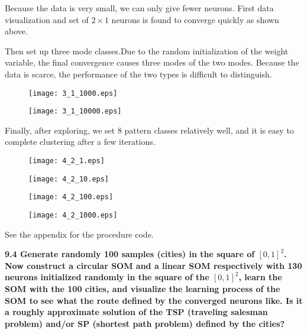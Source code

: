 Because the data is very small, we can only give fewer neurons.
First data visualization
and set of $2\times1$ neurons is found to converge quickly as shown above.

\newpage
Then set up three mode classes.Due to the random initialization of the weight variable, the final convergence causes three modes of the two modes. Because the data is scarce, the performance of the two types is difficult to distinguish.
\begin{figure}[!h]
\begin{minipage}
{0.5\linewidth}
\centering
\texttt{[image: 3\_1\_1000.eps]}
\end{minipage}
%
\begin{minipage}
{0.5\linewidth}
\centering
\texttt{[image: 3\_1\_10000.eps]}
\end{minipage}
\end{figure}


Finally, after exploring, we set 8 pattern classes relatively well, and it is easy to complete clustering after a few iterations.
\begin{figure}[!h]
\begin{minipage}
{0.5\linewidth}
\centering
\texttt{[image: 4\_2\_1.eps]}
\end{minipage}
%
\begin{minipage}
{0.5\linewidth}
\centering
\texttt{[image: 4\_2\_10.eps]}
\end{minipage}
\end{figure}
\begin{figure}[!h]
\begin{minipage}
{0.5\linewidth}
\centering
\texttt{[image: 4\_2\_100.eps]}
\end{minipage}
%
\begin{minipage}
{0.5\linewidth}
\centering
\texttt{[image: 4\_2\_1000.eps]}
\end{minipage}
\end{figure}

See the appendix for the procedure code.

\newpage
\noindent \textbf{9.4 Generate randomly 100 samples (cities) in the square of $[0,1]^2$. Now construct a circular SOM and a
linear SOM respectively with 130 neurons initialized randomly in the square of the $[0,1]^2$, learn the
SOM with the 100 cities, and visualize the learning process of the SOM to see what the route defined by
the converged neurons like. Is it a roughly approximate solution of the TSP (traveling salesman problem)
and/or SP (shortest path problem) defined by the cities?}








